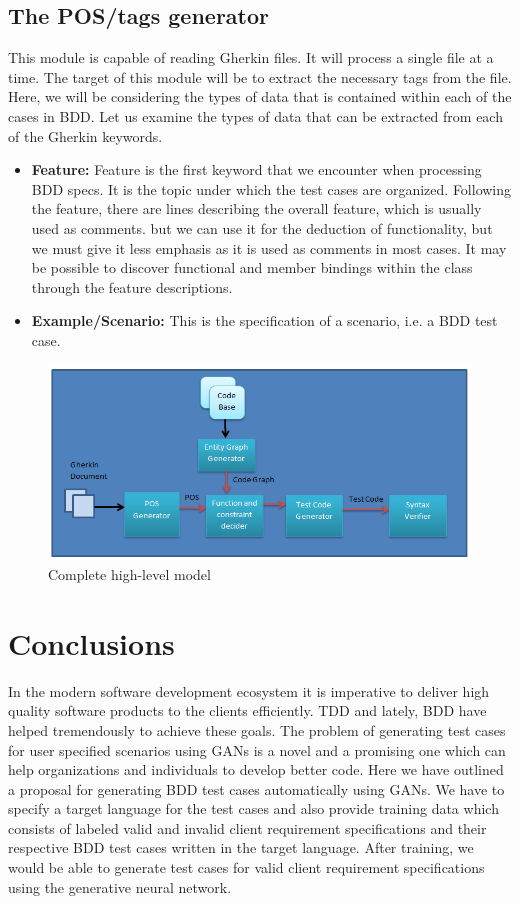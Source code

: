 \documentclass[conference]{IEEEtran}
\begin{document}
\subsection{The POS/tags generator}
This module is capable of reading Gherkin files. It will process a single file at a time. The target of this module will be to extract the necessary tags from the file. Here, we will be considering the types of data that is contained within each of the cases in BDD. Let us examine the types of data that can be extracted from each of the Gherkin keywords.

\begin{itemize}
	\item \textbf{Feature:}
	Feature is the first keyword that we encounter when processing BDD specs. It is the topic under which the test cases are organized. Following the feature, there are lines describing the overall feature, which is usually used as comments. but we can use it for the deduction of functionality, but we must give it less emphasis as it is used as comments in most cases. It may be possible to discover functional and member bindings within the class through the feature descriptions.
	\item \textbf{Example/Scenario:}  
	This is the specification of a scenario, i.e. a BDD test case.
\end{itemize}

\begin{figure}
	\includegraphics[width=\linewidth]{Complete_high_level_modules.png}
	\caption{Complete high-level model}
	\label{fig13}
\end{figure}

\section{Conclusions}
In the modern software development ecosystem it is imperative to deliver high quality software products to the clients efficiently. TDD and lately, BDD have helped tremendously to achieve these goals. The problem of generating test cases for user specified scenarios using GANs is a novel and a promising one which can help organizations and individuals to develop better code. Here we have outlined a proposal for generating BDD test cases automatically using GANs. We have to specify a target language for the test cases and also provide training data which consists of labeled valid and invalid client requirement specifications and their respective BDD test cases written in the target language. After training, we would be able to generate test cases for valid client requirement specifications using the generative neural network.
\end{document}
